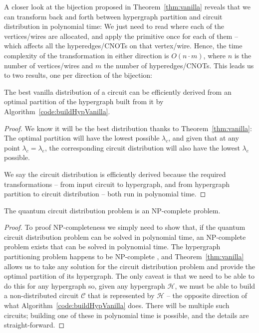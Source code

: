 A closer look at the bijection proposed in Theorem~\ref{thm:vanilla} reveals that we can transform back and forth between hypergraph partition and circuit distribution in polynomial time: We just need to read where each of the vertices/wires are allocated, and apply the primitive once for each of them -- which affects all the hyperedges/CNOTs on that vertex/wire. Hence, the time complexity of the transformation in either direction is \(O(n\cdot m)\), where \(n\) is the number of vertices/wires and \(m\) the number of hyperedges/CNOTs. This leads us to two results, one per direction of the bijection:

\begin{corollary} The best vanilla distribution of a circuit can be efficiently derived from an optimal partition of the hypergraph built from it by Algorithm~\ref{code:buildHypVanilla}.
\label{col:vanilla}
\end{corollary} \begin{proof}
We know it will be the best distribution thanks to Theorem~\ref{thm:vanilla}: The optimal partition will have the lowest possible \(\lambda_c\), and given that at any point \(\lambda_c = \lambda_e\), the corresponding circuit distribution will also have the lowest \(\lambda_e\) possible.

We say the circuit distribution is efficiently derived because the required transformations -- from input circuit to hypergraph, and from hypergraph partition to circuit distribution -- both run in polynomial time.

\end{proof}

\begin{corollary} The quantum circuit distribution problem is an NP-complete problem.
\end{corollary} \begin{proof}
To proof NP-completeness we simply need to show that, if the quantum circuit distribution problem can be solved in polynomial time, an NP-complete problem exists that can be solved in polynomial time. The hypergraph partitioning problem happens to be NP-complete \citep{NP-complete}, and Theorem~\ref{thm:vanilla} allows us to take any solution for the circuit distribution problem and provide the optimal partition of its hypergraph. The only caveat is that we need to be able to do this for any hypergraph so, given any hypergraph \(\mathcal{H}\), we must be able to build a non-distributed circuit \(\mathcal{C}\) that is represented by \(\mathcal{H}\) -- the opposite direction of what Algorithm~\ref{code:buildHypVanilla} does. There will be multiple such circuits; building one of these in polynomial time is possible, and the details are straight-forward.

\end{proof}

